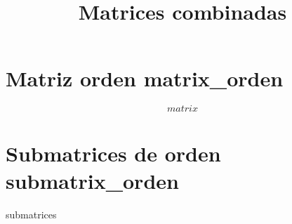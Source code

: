 \documentclass[12pt]{article}
\begin{document}
\title{Matrices combinadas}
\maketitle

\section*{Matriz orden {{matrix_orden}}}

$${{matrix}}$$

\section*{Submatrices de orden {{submatrix_orden}}}

{{submatrices}}
\end{document}
